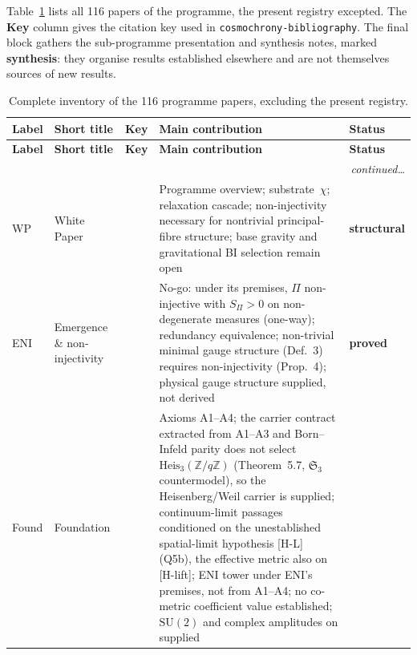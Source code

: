 \documentclass[11pt,a4paper]{article}
\newcommand{\Heis}{\mathrm{Heis}}
\newcommand{\SU}{\mathrm{SU}}
\newcommand{\sproved}{\textcolor{cproved}{\textbf{proved}}}
\newcommand{\sstruct}{\textcolor{cstruct}{\textbf{structural}}}
\newcommand{\ssynth}{\textcolor{csynth}{\textbf{synthesis}}}
\begin{document}
    Table~\ref{tab:inventory} lists all 116 papers of the programme, the present registry excepted.
    The \textbf{Key} column gives the citation key used in
    \texttt{cosmochrony-bibliography}.
    The final block gathers the sub-programme presentation and synthesis notes, marked
    \ssynth{}: they organise results established elsewhere and are not themselves sources of new
    results.

    \setlength\LTleft{0pt}
    \setlength\LTright{0pt}
    \begin{longtable}{@{}p{1.70cm}p{2.9cm}p{1.3cm}p{6.25cm}>{\raggedright\arraybackslash}p{2.0cm}@{}}
      \caption{Complete inventory of the 116 programme papers, excluding the present registry.}
      \label{tab:inventory}\\
      \toprule
      \textbf{Label} & \textbf{Short title} & \textbf{Key} & \textbf{Main contribution} & \textbf{Status}\\
      \midrule
      \endfirsthead
      \toprule
      \textbf{Label} & \textbf{Short title} & \textbf{Key} & \textbf{Main contribution} & \textbf{Status}\\
      \midrule
      \endhead
      \midrule\multicolumn{5}{r}{\small\itshape continued\ldots}\\\midrule
      \endfoot
      \bottomrule
      \endlastfoot
      WP & White Paper & \cite{Cosmochrony} &
      Programme overview; substrate~$\chi$; relaxation cascade; non-injectivity necessary for nontrivial
      principal-fibre structure; base gravity and gravitational BI selection remain open &
      \sstruct \\[3pt]
      ENI & Emergence \& non-injectivity & \cite{Beau2026l} &
      No-go: under its premises, $\Pi$ non-injective with $S_\Pi>0$ on non-degenerate measures (one-way);
      redundancy equivalence; non-trivial minimal gauge structure (Def.~3) requires non-injectivity (Prop.~4);
      physical gauge structure supplied, not derived &
      \sproved \\[3pt]
      Found & Foundation & \cite{Beau2026m} &
      Axioms A1--A4; the carrier contract extracted from A1--A3 and Born--Infeld parity does not select
      $\Heis_3(\mathbb{Z}/q\mathbb{Z})$ (Theorem~5.7, $\mathfrak{S}_3$ countermodel), so the Heisenberg/Weil
      carrier is supplied;
      continuum-limit passages conditioned on the unestablished spatial-limit hypothesis
      [H-L] (Q5b), the effective metric also on [H-lift]; ENI tower under ENI's premises, not from A1--A4;
      no co-metric coefficient value established; $\SU(2)$ and complex amplitudes on supplied

\end{longtable}
\end{document}
